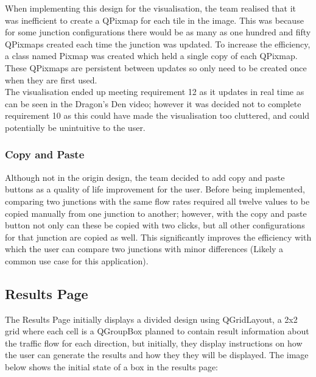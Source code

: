 \documentclass{article}
\begin{document}
        When implementing this design for the visualisation, the team realised that it was inefficient to create a QPixmap for each tile in the image. This
        was because for some junction configurations there would be as many as one hundred and fifty QPixmaps created each time the junction was updated. To
        increase the efficiency, a class named Pixmap was created which held a single copy of each QPixmap. These QPixmaps are persistent between updates so
        only need to be created once when they are first used.\\

            The visualisation ended up meeting requirement 12 as it updates in real time as can be seen in the Dragon's Den video; however it was decided not to complete requirement 10 as this could have made the visualisation too cluttered, and could potentially be unintuitive to the user.
        
        \subsubsection{Copy and Paste}
            Although not in the origin design, the team decided to add copy and paste buttons as a quality of life improvement for the user.
            Before being implemented, comparing two junctions with the same flow rates required all twelve values to be copied manually from one junction to another; however, with the copy and paste button not only can these be copied with two clicks, but all other configurations for that junction are copied as well. 
            This significantly improves the efficiency with which the user can compare two junctions with minor differences (Likely a common use case for this application).



    \subsection{Results Page}

    The Results Page initially displays a divided design using QGridLayout, a 2x2 grid where each cell is a QGroupBox planned to contain result information about the traffic flow for each direction, but initially,
    they display instructions on how the user can generate the results and how they they will be displayed. The image below shows the initial state of a box in the results page:
\end{document}
